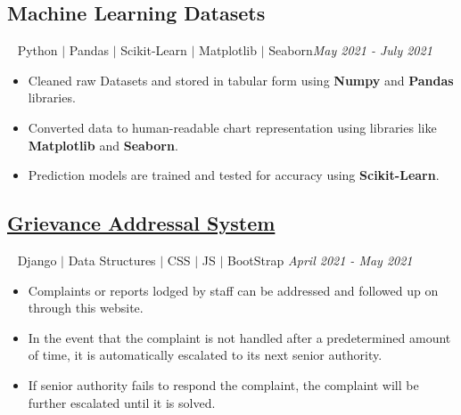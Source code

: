 \documentclass[12pt]{article}
\begin{document}
\subsection*{Machine Learning Datasets}~ Python $\vert$ Pandas $\vert$ Scikit-Learn $\vert$ Matplotlib $\vert$ Seaborn\hfill \textit{May 2021 - July 2021} \\
\begin{itemize}[topsep=0pt,itemsep=1pt,partopsep=1pt, parsep=1pt]
    \item Cleaned raw Datasets and stored in tabular form using \textbf{Numpy} and \textbf{Pandas} libraries.
    \item Converted data to human-readable chart representation using libraries like \textbf{Matplotlib} and \textbf{Seaborn}.
    \item Prediction models are trained and tested for accuracy using \textbf{Scikit-Learn}.
\end{itemize}

\subsection*{\href{https://github.com/prabhavagrawal7/grievance-addressal-system}{Grievance Addressal System}}~ Django $\vert$ Data Structures $\vert$ CSS $\vert$ JS $\vert$ BootStrap \hfill \textit{April 2021 - May 2021} \\
\begin{itemize}[topsep=0pt,itemsep=1pt,partopsep=1pt, parsep=1pt]
    \item Complaints or reports lodged by staff can be addressed and followed up on through this website.
	\item In the event that the complaint is not handled after a predetermined amount of time, it is automatically escalated to its next senior authority.
	\item If senior authority fails to respond the complaint, the complaint will be further escalated until it is solved. 
\end{itemize}
\end{document}

